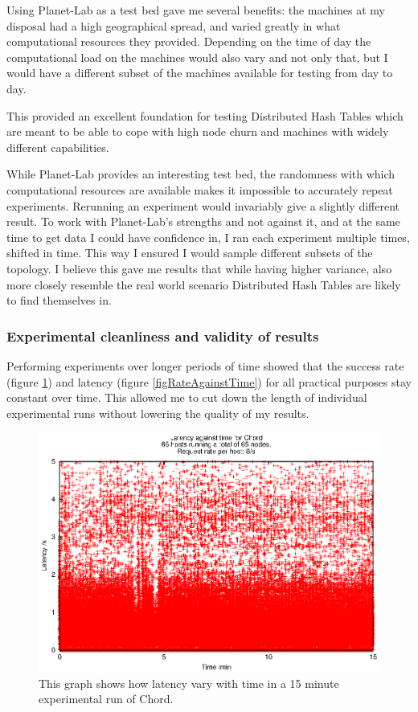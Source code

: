 Using Planet-Lab as a test bed gave me several benefits: the machines at my disposal had a high geographical spread, and varied greatly in what computational resources they provided. Depending on the time of day the computational load on the machines would also vary and not only that, but I would have a different subset of the machines available for testing from day to day.

This provided an excellent foundation for testing Distributed Hash Tables which are meant to be able to cope with high node churn and machines with widely different capabilities.

While Planet-Lab provides an interesting test bed, the randomness with which computational resources are available makes it impossible to accurately repeat experiments. Rerunning an experiment would invariably give a slightly different result.
To work with Planet-Lab's strengths and not against it, and at the same time to get data I could have confidence in, I ran each experiment multiple times, shifted in time. This way I ensured I would sample different subsets of the topology. I believe this gave me results that while having higher variance, also more closely resemble the real world scenario Distributed Hash Tables are likely to find themselves in.

\subsubsection{Experimental cleanliness and validity of results}
Performing experiments over longer periods of time showed that the success rate (figure \ref{figLatencyAgainstTime}) and latency (figure \ref{figRateAgainstTime}) for all practical purposes stay constant over time. This allowed me to cut down the length of individual experimental runs without lowering the quality of my results.

\begin{figure}[!htb]
  \begin{center}
    \includegraphics[]{illustrations/latency_aginst_time_chord.eps}
    \caption{This graph shows how latency vary with time in a 15 minute experimental run of Chord.}
    \label{figLatencyAgainstTime}
  \end{center}
\end{figure}

